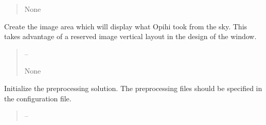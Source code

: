 \documentclass[letterpaper,11pt,english]{sphinxmanual}
\begin{document}
\begin{savenotes}
\begin{fulllineitems}
\begin{savenotes}
\begin{fulllineitems}
\begin{quote}
\begin{description}
\sphinxAtStartPar
None

\end{description}\end{quote}

\end{fulllineitems}\end{savenotes}


\begin{savenotes}\begin{fulllineitems}
\label{\detokenize{code/opihiexarata.gui.manual:opihiexarata.gui.manual.OpihiManualWindow.__init_opihi_image}}
\pysigstartsignatures
{}
\pysigstopsignatures
\sphinxAtStartPar
Create the image area which will display what Opihi took from the
sky. This takes advantage of a reserved image vertical layout in the
design of the window.
\begin{quote}\begin{description}
\sphinxAtStartPar
{} – 

\sphinxAtStartPar
None

\end{description}\end{quote}

\end{fulllineitems}\end{savenotes}


\begin{savenotes}\begin{fulllineitems}
\label{\detokenize{code/opihiexarata.gui.manual:opihiexarata.gui.manual.OpihiManualWindow.__init_preprocess_solution}}
\pysigstartsignatures
{}
\pysigstopsignatures
\sphinxAtStartPar
Initialize the preprocessing solution. The preprocessing files
should be specified in the configuration file.
\begin{quote}\begin{description}
\sphinxAtStartPar
{} – 


\end{description}
\end{quote}
\end{fulllineitems}
\end{savenotes}
\end{fulllineitems}
\end{savenotes}
\end{document}
